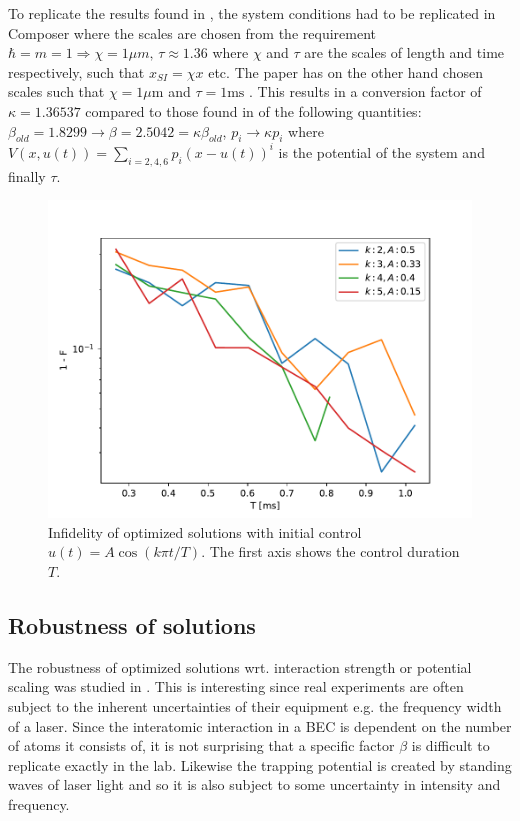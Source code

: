 \documentclass[aps,pra,reprint,superscriptaddress]{revtex4-1}
\begin{document}
To replicate the results found in \cite{QM2Paper}, the system conditions had to be replicated in Composer where the scales are chosen from the requirement $\hbar = m = 1 \Rightarrow \chi = 1\mu m, \, \tau \approx 1.36$ where $\chi$ and $\tau$ are the scales of length and time respectively, such that $x_{SI}=\chi x$ etc. The paper has on the other hand chosen scales such that $\chi = 1 \mu\text{m}$ and $\tau = 1 \text{ms}$ \cite{QEngine}. This results in a conversion factor of $\kappa = 1.36537$ compared to those found in \cite{QEngine} of the following quantities: $\beta_{old} = 1.8299 \rightarrow \beta = 2.5042 = \kappa \beta_{old}$, $p_i \rightarrow \kappa p_i$ where $V(x,u(t)) = \sum_{i=2,4,6} p_i (x-u(t))^i$ is the potential of the system and finally $\tau$. \\

\begin{figure}
	\includegraphics[width=\columnwidth]{graphics/newclustering/QM2Clustering.pdf}
	\caption{Infidelity of  optimized solutions with initial control $u(t)=A\cos(k\pi t/T)$. The first axis shows the control duration $T$.}
	\label{fig:Clustering}
\end{figure}

\subsection{\label{subsec:robustness} Robustness of solutions}
The robustness of optimized solutions wrt. interaction strength or potential scaling was studied in \cite{GroupPaper}. This is interesting since real experiments are often subject to the inherent uncertainties of their equipment e.g. the frequency width of a laser. Since the interatomic interaction in a BEC is dependent on the number of atoms it consists of, it is not surprising that a specific factor $\beta$ is difficult to replicate exactly in the lab. Likewise the trapping potential is created by standing waves of laser light and so it is also subject to some uncertainty in intensity and frequency.  \\
\end{document}
